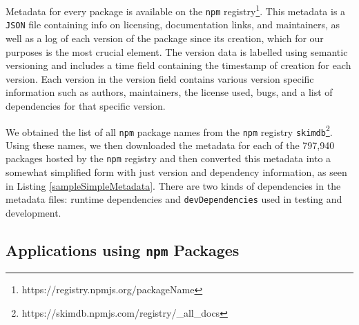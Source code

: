\documentclass[10pt,conference]{IEEEtran}
\def\code#1{\texttt{#1}}
\begin{document}
Metadata for every package is available on the \code{npm}
registry\footnote{https://registry.npmjs.org/packageName}. 
This metadata is a \code{JSON} file containing info 
on licensing, documentation links, and maintainers, as well as
a log of each version of the package since its creation, which 
for our purposes is the most crucial element.
The version data is labelled using semantic 
versioning \cite{preston-werner} and includes a time field containing 
the timestamp of creation for each version. Each version in the version 
field contains various version specific information such as authors, 
maintainers, the license used, bugs, and a list of dependencies for that specific
version.

We obtained the list of all \code{npm} package names from 
the \code{npm} registry \code{skimdb}\footnote{https://skimdb.npmjs.com/registry/\_all\_docs}. Using these names,
we then downloaded the metadata for each of the 797,940 packages hosted by the
\code{npm} registry and then converted this metadata into a somewhat simplified form 
with just version and dependency information, as seen
in Listing \ref{sampleSimpleMetadata}. There are two kinds of dependencies in the metadata
files: runtime dependencies and \code{devDependencies} used in testing and development.


\subsection{Applications using \code{npm} Packages}
\end{document}
